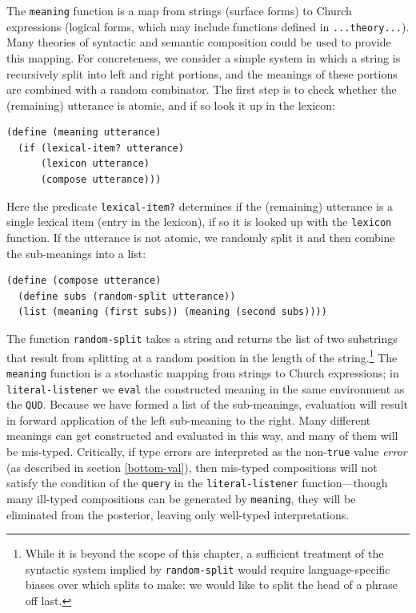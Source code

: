 \documentclass[pdfextras]{handbook}
\begin{document}
The \lstinline{meaning} function is a map from strings (surface forms) to Church expressions (logical forms, which may include functions defined in \lstinline{...theory...}).
Many theories of syntactic and semantic composition could be used to provide this mapping. 
For concreteness, we consider a simple system in which a string is recursively split into left and right portions, and the meanings of these portions are combined with a random combinator. The first step is to check whether the (remaining) utterance is atomic, and if so look it up in the lexicon:
\begin{lstlisting}
(define (meaning utterance)
  (if (lexical-item? utterance)
      (lexicon utterance)
      (compose utterance)))
\end{lstlisting}
Here the predicate \lstinline{lexical-item?} determines if the (remaining) utterance is a single lexical item (entry in the lexicon), if so it is looked up with the \lstinline{lexicon} function. If the utterance is not atomic, we randomly split it and then combine the sub-meanings into a list:
\begin{lstlisting}
(define (compose utterance)
  (define subs (random-split utterance))
  (list (meaning (first subs)) (meaning (second subs))))
\end{lstlisting}
The function \lstinline{random-split} takes a string and returns the list of two substrings that result from splitting at a random position in the length of the string.\footnote{While it is beyond the scope of this chapter, a sufficient treatment of the syntactic system implied by \lstinline{random-split} would require language-specific biases over which splits to make: we would like to split the head of a phrase off last.}
The \lstinline{meaning} function is a stochastic mapping from strings to Church expressions; in \lstinline{literal-listener} we \lstinline{eval} the constructed meaning in the same environment as the \lstinline{QUD}. Because we have formed a list of the sub-meanings, evaluation will result in forward application of the left sub-meaning to the right. Many different meanings can get constructed and evaluated in this way, and many of them will be mis-typed.
Critically, if type errors are interpreted as the non-\lstinline{true} value \emph{error} (as described in section \ref{bottom-val}), then mis-typed compositions will not satisfy the condition of the \lstinline{query} in the \lstinline{literal-listener} function---though many ill-typed compositions can be generated by \lstinline{meaning}, they will be eliminated from the posterior, leaving only well-typed interpretations.
\end{document}
